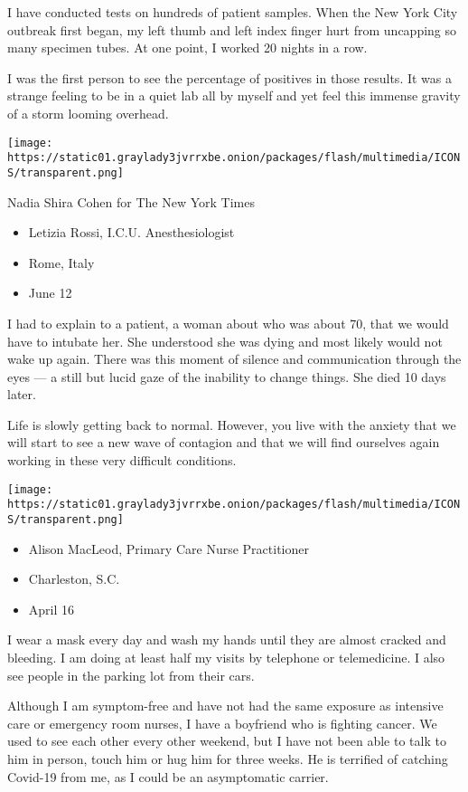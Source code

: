 I have conducted tests on hundreds of patient samples. When the New York
City outbreak first began, my left thumb and left index finger hurt from
uncapping so many specimen tubes. At one point, I worked 20 nights in a
row.

I was the first person to see the percentage of positives in those
results. It was a strange feeling to be in a quiet lab all by myself and
yet feel this immense gravity of a storm looming overhead.

\texttt{[image: https://static01.graylady3jvrrxbe.onion/packages/flash/multimedia/ICONS/transparent.png]}

Nadia Shira Cohen for The New York Times

\begin{itemize}
\tightlist
\item
   Letizia Rossi, I.C.U. Anesthesiologist
\item
  Rome, Italy
\item
  June 12
\end{itemize}

I had to explain to a patient, a woman about who was about 70, that we
would have to intubate her. She understood she was dying and most likely
would not wake up again. There was this moment of silence and
communication through the eyes --- a still but lucid gaze of the
inability to change things. She died 10 days later.

Life is slowly getting back to normal. However, you live with the
anxiety that we will start to see a new wave of contagion and that we
will find ourselves again working in these very difficult conditions.

\texttt{[image: https://static01.graylady3jvrrxbe.onion/packages/flash/multimedia/ICONS/transparent.png]}

\begin{itemize}
\tightlist
\item
  Alison MacLeod, Primary Care Nurse Practitioner
\item
  Charleston, S.C.
\item
  April 16
\end{itemize}

I wear a mask every day and wash my hands until they are almost cracked
and bleeding. I am doing at least half my visits by telephone or
telemedicine. I also see people in the parking lot from their cars.

Although I am symptom-free and have not had the same exposure as
intensive care or emergency room nurses, I have a boyfriend who is
fighting cancer. We used to see each other every other weekend, but I
have not been able to talk to him in person, touch him or hug him for
three weeks. He is terrified of catching Covid-19 from me, as I could be
an asymptomatic carrier.

